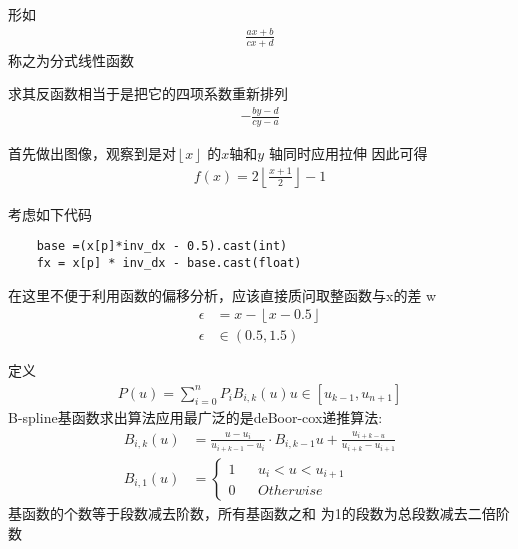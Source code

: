 \begin{thm}[分式线性函数]
形如
\begin{align}
		\frac{ax+b}{cx+d} 
\end{align}
称之为分式线性函数
\par 求其反函数相当于是把它的四项系数重新排列
\begin{align}
	-	\frac{by-d}{cy-a} 
\end{align}
\end{thm}
\begin{thm}
\end{thm}
\begin{thm}[求$x$左边最近的奇数]
首先做出图像，观察到是对$ \left\lfloor x \right\rfloor $ 的$x$轴和$ y $ 轴同时应用拉伸
因此可得
\begin{align*}
		f(x) = 2\left\lfloor \frac{x+1}{2}  \right\rfloor -1
\end{align*}
\end{thm}
\begin{thm}[取整函数分析]
	考虑如下代码	
	\begin{lstlisting}
	base =(x[p]*inv_dx - 0.5).cast(int)
	fx = x[p] * inv_dx - base.cast(float)
	\end{lstlisting}
	在这里不便于利用函数的偏移分析，应该直接质问取整函数与x的差 
	w\begin{align*}
			\epsilon  &= x- \left\lfloor x-0.5\right\rfloor \\
			\epsilon &\in \left( 0.5,1.5 \right) 
	\end{align*}	
\end{thm}
\begin{thm}
		定义
		\begin{align*}
				P\left( u \right) =\sum_{i=0}^{n} P_iB_{i,k}(u) 
				u \in \left[ u_{k-1},u_{n+1} \right] 
		\end{align*}
		B-spline基函数求出算法应用最广泛的是deBoor-cox递推算法:
		\begin{align*}
				B_{i,k}\left( u \right) &=\frac{u-u_i}{u_{i+k-1}-u_i} \cdot B_{i,k-1}u+\frac{u_{i+k-u}}{u_{i+k}-u_{i+1}} \\
				B_{i,1}\left( u \right) &=\left\{\begin{aligned}
								1  && u_i<u<u_{i+1}\\
	0 && Otherwise
				\end{aligned}\right.
		\end{align*}
		基函数的个数等于段数减去阶数，所有基函数之和
		为1的段数为总段数减去二倍阶数
\end{thm}

